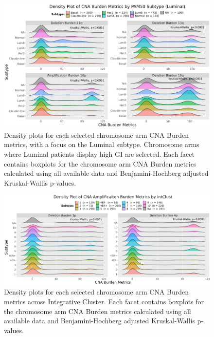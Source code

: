 \begin{figure}[!htb]
\center
\includegraphics[width=1\textwidth]{../figures/Chapter_2/ChrArm_CNA_Burden_Metrics_Across_PAM50_Luminal_Burden.png}
\caption[Density plots for each selected chromosome arm CNA Burden metrics, with a focus on the Luminal subtype.]{Density plots for each selected chromosome arm CNA Burden metrics, with a focus on the Luminal subtype. Chromosome arms where Luminal patients display high GI are selected. Each facet contains boxplots for the chromosome arm CNA Burden metrics calculated using all available data and Benjamini-Hochberg adjusted Kruskal-Wallis p-values.}
\label{fig:PA-CNA-Score-Metric-Density-P50-16q}
\end{figure}

\begin{figure}[!htb]
\center
\includegraphics[width=1\textwidth]{../figures/Chapter_2/ChrArm_CNA_Burden_Metrics_Across_IC.png}
\caption[Density plots for each selected chromosome arm CNA Burden metrics across Integrative Cluster.]{Density plots for each selected chromosome arm CNA Burden metrics across Integrative Cluster. Each facet contains boxplots for the chromosome arm CNA Burden metrics calculated using all available data and Benjamini-Hochberg adjusted Kruskal-Wallis p-values.}
\label{fig:PA_IC}
\end{figure}

